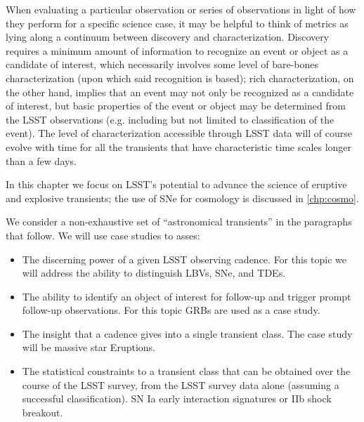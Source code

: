 When evaluating a particular observation or series of observations in light of how they perform for a specific science case, it may be helpful to think of metrics as lying along a continuum between discovery and characterization. Discovery requires a minimum amount of information to recognize an event or object as a candidate of interest, which necessarily involves some level of bare-bones characterization (upon which said recognition is based); rich characterization, on the other hand, implies that an event may not only be recognized as a candidate of interest, but basic properties of the event or object may be determined from the LSST observations (e.g. including but not limited to classification of the event). The level of characterization accessible through LSST data will of course evolve with time for all the transients that have characteristic time scales longer than a few days. 

In this chapter we focus on LSST's potential to advance the science of eruptive and explosive transients; the use of SNe for cosmology is discussed in \autoref{chp:cosmo}.

We consider a non-exhaustive set of ``astronomical transients'' in the paragraphs that follow. We will use case studies to asses: 

\begin{itemize}
\item
The discerning power of a given LSST observing cadence. For this topic we will address the ability to distinguish LBVs, SNe, and TDEs.
\item
The ability to identify an object of interest for follow-up and trigger prompt follow-up observations. For this topic GRBs are used as a case study.
\item
The insight that a cadence gives into a single transient class. The case study will be massive star Eruptions.
\item 
The statistical constraints to a transient class that can be obtained over the course of the LSST survey, from the LSST survey data alone (assuming a successful classification). SN Ia early interaction signatures or IIb shock breakout.
\end{itemize}


